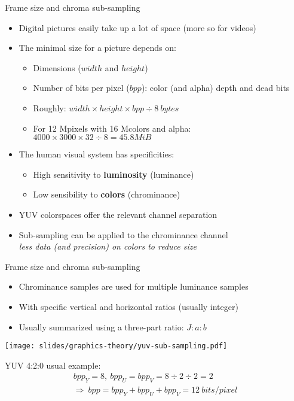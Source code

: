 \begin{frame}{Frame size and chroma sub-sampling}
  \begin{itemize}
  \item Digital pictures easily take up a lot of space (more so for videos)
  \item The minimal size for a picture depends on:
    \begin{itemize}
    \item Dimensions (\(width\) and \(height\))
    \item Number of bits per pixel (\(bpp\)): color (and alpha) depth and dead bits
    \item Roughly: \(width \times height \times bpp \div 8~bytes\)
    \item For 12 Mpixels with 16 Mcolors and alpha: \(4000 \times 3000 \times 32 \div 8 = 45.8 MiB\)
    \end{itemize}
  \item The human visual system has specificities:
    \begin{itemize}
    \item High sensitivity to \textbf{luminosity} (luminance)
    \item Low sensibility to \textbf{colors} (chrominance)
    \end{itemize}
  \item YUV colorspaces offer the relevant channel separation
  \item Sub-sampling can be applied to the chrominance channel\\
  \textit{less data (and precision) on colors to reduce size}
  \end{itemize}
\end{frame}

\begin{frame}{Frame size and chroma sub-sampling}
  \begin{itemize}
  \item Chrominance samples are used for multiple luminance samples
  \item With specific vertical and horizontal ratios (usually integer)
  \item Usually summarized using a three-part ratio: \(J:a:b\)
  \end{itemize}

  \begin{center}
  \texttt{[image: slides/graphics-theory/yuv-sub-sampling.pdf]}

  YUV 4:2:0 usual example:
  {\small
  \begin{equation*}
  \begin{gathered}
  bpp_Y = 8,~bpp_U = bpp_V = 8 \div 2 \div 2 = 2 \\
  \Rightarrow~ bpp = bpp_Y + bpp_U + bpp_V = 12~bits/pixel
  \end{gathered}
  \end{equation*}
  }
  \end{center}
\end{frame}

